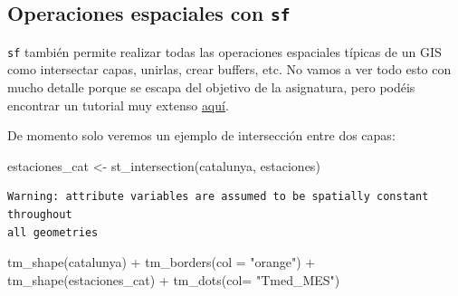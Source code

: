 \documentclass[
  letterpaper,
  DIV=11,
  numbers=noendperiod]{scrreprt}
\newenvironment{Shaded}{\begin{snugshade}}{\end{snugshade}}
\newcommand{\AttributeTok}[1]{\textcolor[rgb]{0.40,0.45,0.13}{#1}}
\newcommand{\FunctionTok}[1]{\textcolor[rgb]{0.28,0.35,0.67}{#1}}
\newcommand{\NormalTok}[1]{\textcolor[rgb]{0.00,0.23,0.31}{#1}}
\newcommand{\OtherTok}[1]{\textcolor[rgb]{0.00,0.23,0.31}{#1}}
\newcommand{\SpecialCharTok}[1]{\textcolor[rgb]{0.37,0.37,0.37}{#1}}
\newcommand{\StringTok}[1]{\textcolor[rgb]{0.13,0.47,0.30}{#1}}
\begin{document}
\hypertarget{operaciones-espaciales-con-sf}{%
\subsection{\texorpdfstring{Operaciones espaciales con
\texttt{sf}}{Operaciones espaciales con sf}}\label{operaciones-espaciales-con-sf}}

\texttt{sf} también permite realizar todas las operaciones espaciales
típicas de un GIS como intersectar capas, unirlas, crear buffers, etc.
No vamos a ver todo esto con mucho detalle porque se escapa del objetivo
de la asignatura, pero podéis encontrar un tutorial muy extenso
\href{https://geocompr.robinlovelace.net/spatial-operations.html}{aquí}.

De momento solo veremos un ejemplo de intersección entre dos capas:

\begin{Shaded}
\begin{Highlighting}[]
\NormalTok{estaciones\_cat }\OtherTok{\textless{}{-}} \FunctionTok{st\_intersection}\NormalTok{(catalunya, estaciones)}
\end{Highlighting}
\end{Shaded}

\begin{verbatim}
Warning: attribute variables are assumed to be spatially constant throughout
all geometries
\end{verbatim}

\begin{Shaded}
\begin{Highlighting}[]
\FunctionTok{tm\_shape}\NormalTok{(catalunya) }\SpecialCharTok{+}
    \FunctionTok{tm\_borders}\NormalTok{(}\AttributeTok{col =} \StringTok{"orange"}\NormalTok{) }\SpecialCharTok{+}
\FunctionTok{tm\_shape}\NormalTok{(estaciones\_cat) }\SpecialCharTok{+}
    \FunctionTok{tm\_dots}\NormalTok{(}\AttributeTok{col=} \StringTok{"Tmed\_MES"}\NormalTok{)}
\end{Highlighting}
\end{Shaded}
\end{document}

